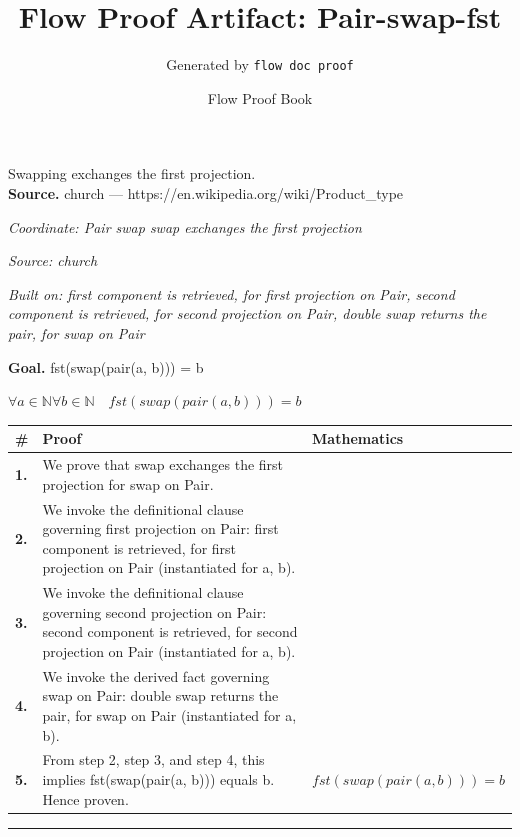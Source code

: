 \documentclass[11pt]{article}
\title{Flow Proof Artifact: Pair-swap-fst}
\author{Generated by \texttt{flow doc proof}}
\date{Flow Proof Book}
\theoremstyle{definition}
\begin{document}
\maketitle
Swapping exchanges the first projection.\\[0.5em]
\textbf{Source.} church — https://en.wikipedia.org/wiki/Product\_type\\[0.5em]
\bigskip
{}\par
\smallskip\noindent\textit{Coordinate: Pair \cdot swap \cdot swap exchanges the first projection}\par
\smallskip\noindent\textit{Source: church}\par
\smallskip\noindent\textit{Built on: first component is retrieved, for first projection on Pair, second component is retrieved, for second projection on Pair, double swap returns the pair, for swap on Pair}\par
\medskip
\noindent\textbf{Goal.} fst(swap(pair(a, b))) = b\par
\noindent$\displaystyle \forall a \in \mathbb{N} \forall b \in \mathbb{N}\quad fst(swap(pair(a, b))) = b$\par
\medskip
\noindent
\begin{tabular}{@{} >{\raggedright\arraybackslash}p{} >{\raggedright\arraybackslash}p{} >{\raggedleft\arraybackslash}p{} @{}}
\textbf{\#} & \textbf{Proof} & \textbf{Mathematics} \\
\midrule
\textbf{1.} & We prove that swap exchanges the first projection for swap on Pair. & \\[0.45em]
\textbf{2.} & We invoke the definitional clause governing first projection on Pair: first component is retrieved, for first projection on Pair (instantiated for a, b). & \\[0.45em]
\textbf{3.} & We invoke the definitional clause governing second projection on Pair: second component is retrieved, for second projection on Pair (instantiated for a, b). & \\[0.45em]
\textbf{4.} & We invoke the derived fact governing swap on Pair: double swap returns the pair, for swap on Pair (instantiated for a, b). & \\[0.45em]
\textbf{5.} & From step 2, step 3, and step 4, this implies fst(swap(pair(a, b))) equals b. Hence proven. & $\displaystyle fst(swap(pair(a, b))) = b$ \\[0.45em]
\bottomrule
\end{tabular}
\label{thm:Pair-swap-swap_exchanges_the_first_projection}
\par\medskip\hrule
\end{document}
